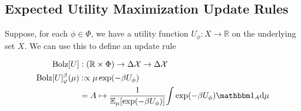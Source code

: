 \documentclass{article}
\begin{document}
\subsection{Expected Utility Maximization Update Rules}


%
%

\def\Bolz#1{\mathrm{Bolz}[#1]}


Suppose, for each $\phi \in \Phi$, we have a utility function $U_\phi : X \to \mathbb R$ on the underlying set $X$.
We can use this to define an update rule

\begin{align*}
    \Bolz U &: (\mathbb R \times \Phi) \to \Delta\X \to \Delta\X \\
    \Bolz U^\beta_\varphi(\mu)
        &:\propto
            \mu \exp(-\beta U_\phi) \\
        &= A \mapsto \frac
            1{\Ex_{\mu} [ \exp(-\beta U_\phi)]}
            {\int \exp(-\beta U_\phi) \mathbbm 1_A \mathrm d\mu }
\end{align*}
\end{document}
